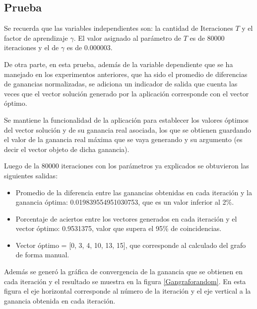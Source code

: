 \subsection{Prueba}

Se recuerda que las variables independientes son: la cantidad de Iteraciones $T$ y el factor de aprendizaje $\gamma$. El valor asignado al parámetro de $T$ es de 80000 iteraciones y el de $\gamma$ es de 0.000003. 

De otra parte, en esta prueba, además de la variable dependiente que se ha manejado en los experimentos anteriores, que ha sido el promedio de diferencias de ganancias normalizadas, se adiciona un indicador de salida que cuenta las veces que el vector solución generado por la aplicación corresponde con el vector óptimo.

Se mantiene la funcionalidad de la aplicación para establecer los valores óptimos del vector solución y de su ganancia real asociada, los que se obtienen guardando el valor de la ganancia real máxima que se vaya generando y su argumento (es decir el vector objeto de dicha ganancia).

Luego de la 80000 iteraciones con los parámetros ya explicados se obtuvieron las siguientes salidas:

\begin{itemize}
\item Promedio de la diferencia entre las ganancias obtenidas en cada iteración y la ganancia óptima: 0.019839554951030753, que es un valor inferior al 2\%.
\item Porcentaje de aciertos entre los vectores generados en cada iteración y el vector óptimo: 0.9531375, valor que supera el 95\% de coincidencias.
\item Vector óptimo = [0, 3, 4, 10, 13, 15], que corresponde al calculado del grafo de forma manual.
\end{itemize}

Además se generó la gráfica de convergencia de la ganancia que se obtienen en cada iteración y el resultado se muestra en la figura \ref{Gangraforandom}. En esta figura el eje horizontal corresponde al número de la iteración y el eje vertical a la ganancia obtenida en cada iteración.

